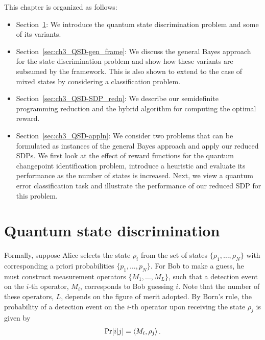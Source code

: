 This chapter is organized as follows:
\begin{itemize}
    \item Section~\ref{sec:ch3_QSD-QSD}: We introduce the quantum state discrimination problem and some of its variants.
    \item Section~\ref{sec:ch3_QSD-gen_frame}: We discuss the general Bayes approach for the state discrimination problem and show how these variants are subsumed by the framework.
    This is also shown to extend to the case of mixed states by considering a classification problem.
    \item Section~\ref{sec:ch3_QSD-SDP_redn}: We describe our semidefinite programming reduction and the hybrid algorithm for computing the optimal reward.
    \item Section~\ref{sec:ch3_QSD-appln}: We consider two problems that can be formulated as instances of the general Bayes approach and apply our reduced SDPs.
    We first look at the effect of reward functions for the quantum changepoint identification problem, introduce a heuristic and evaluate its performance as the number of states is increased.
    Next, we view a quantum error classification task and illustrate the performance of our reduced SDP for this problem.
\end{itemize}

\section{Quantum state discrimination} \label{sec:ch3_QSD-QSD}

Formally, suppose Alice selects the state $\rho_i$ from the set of states $\{\rho_1, \dots, \rho_N\}$ with corresponding a priori probabilities $\{p_1, \dots, p_N\}$.
For Bob to make a guess, he must construct measurement operators $\{M_1, \dots, M_L\}$, such that a detection event on the $i$-th operator, $M_i$, corresponds to Bob guessing $i$. 
Note that the number of these operators, $L$, depends on the figure of merit adopted. 
By Born's rule, the probability of a detection event on the $i$-th operator upon receiving the state $\rho_j$ is given by
\begin{align}
    \label{eq:Jason_Bourne} 
    \Pr[i | j] = \left\langle M_i, \rho_j \right\rangle. 
\end{align} 

